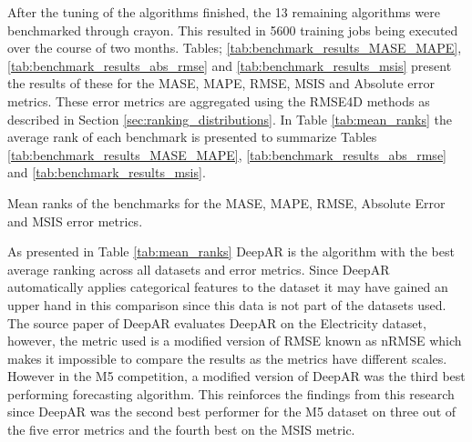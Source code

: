 After the tuning of the algorithms finished,  the 13 remaining algorithms were benchmarked through crayon. This resulted in 5600 training jobs being executed over the course of two months. Tables; \ref{tab:benchmark_results_MASE_MAPE}, \ref{tab:benchmark_results_abs_rmse} and \ref{tab:benchmark_results_msis} present the results of these for the MASE, MAPE, RMSE, MSIS and Absolute error metrics. These error metrics are aggregated using the RMSE4D methods as described in Section \ref{sec:ranking_distributions}. In Table \ref{tab:mean_ranks} the average rank of each benchmark is presented to summarize Tables \ref{tab:benchmark_results_MASE_MAPE}, \ref{tab:benchmark_results_abs_rmse} and \ref{tab:benchmark_results_msis}.

\begin{table}[h]
  \centering
  \caption{Mean ranks of the benchmarks for the MASE, MAPE, RMSE, Absolute Error and MSIS error metrics.}
  \label{tab:mean_ranks}
\end{table}

As presented in Table \ref{tab:mean_ranks} DeepAR is the algorithm with the best average ranking across all datasets and error metrics. Since DeepAR automatically applies categorical features to the dataset it may have gained an upper hand in this comparison since this data is not part of the datasets used. The source paper of DeepAR evaluates DeepAR on the Electricity dataset, however, the metric used is a modified version of RMSE known as nRMSE which makes it impossible to compare the results as the metrics have different scales. However in the M5 competition, a modified version of DeepAR was the third best performing forecasting algorithm. This reinforces the findings from this research since DeepAR was the second best performer for the M5 dataset on three out of the five error metrics and the fourth best on the MSIS metric.

